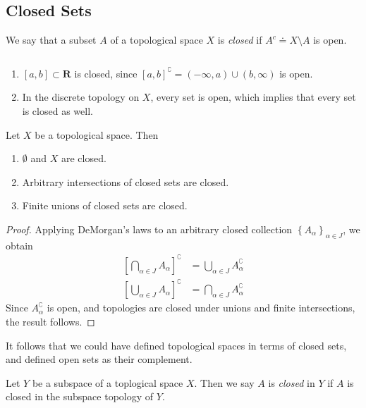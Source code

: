 \subsection{Closed Sets}
\begin{definition}
\label{def:closed-sets}
We say that a subset $A$ of a topological space $X$ is \emph{closed} if
$A^{c} \doteq X \setminus A$ is open.
\end{definition}
\begin{example} $ $
\begin{enumerate}
  \item $[a,b] \subset \mathbf{R}$ is closed, since
  $[a,b]^{\complement} = (-\infty, a) \cup (b, \infty)$ is open.
  \item In the discrete topology on $X$, every set is open, which implies
  that every set is closed as well.
\end{enumerate}
\end{example}
\begin{lemma}
\label{lem:equiv-closed-def-top}
Let $X$ be a topological space. Then
\begin{enumerate}
  \item $\emptyset$ and $X$ are closed.
  \item Arbitrary intersections of closed sets are closed.
  \item Finite unions of closed sets are closed.
\end{enumerate}
\end{lemma}
\begin{proof}
Applying DeMorgan's laws to an arbitrary closed collection
$\left\{ A_{\alpha} \right\}_{\alpha \in J}$, we obtain
\begin{align*}
\left[ \bigcap_{\alpha \in J}A_{\alpha} \right]^{\complement} & = \bigcup_{\alpha \in
J} A_{\alpha}^{\complement} \\
\left[ \bigcup_{\alpha \in J}A_{\alpha} \right]^{\complement} & = \bigcap_{\alpha \in
J} A_{\alpha}^{\complement}
\end{align*}
Since $A_{\alpha}^{\complement}$ is open, and topologies are closed under
unions and finite intersections, the result follows.
\end{proof}
\begin{remark}
\label{rem:equiv-closed-def-top}
It follows that we could have defined topological spaces in terms of closed
sets, and defined open sets as their complement.
\end{remark}
\begin{definition}
\label{def:closed-set-subspace}
Let $Y$ be a subspace of a toplogical space $X$. Then we say $A$
is \emph{closed} in $Y$ if $A$ is closed in the subspace topology of
$Y$.
\end{definition}
